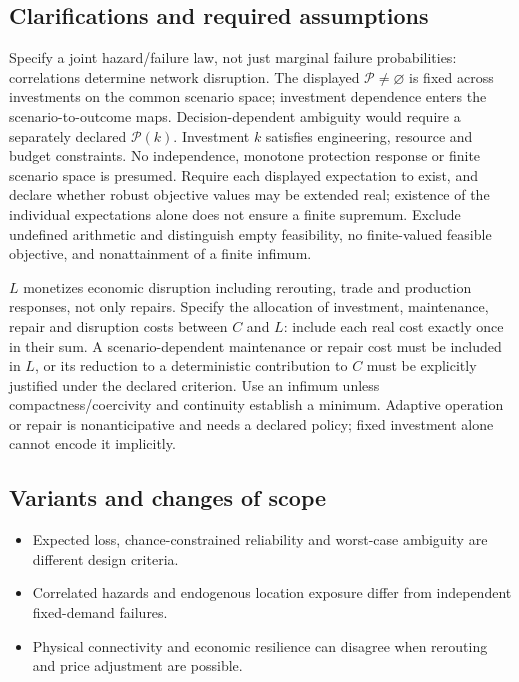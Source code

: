 \documentclass[11pt,a4paper]{article}
\begin{document}
\subsection*{Clarifications and required assumptions}

Specify a joint hazard/failure law, not just marginal failure probabilities: correlations determine network disruption. The displayed $\mathcal P\ne\varnothing$ is fixed across investments on the common scenario space; investment dependence enters the scenario-to-outcome maps. Decision-dependent ambiguity would require a separately declared $\mathcal P(k)$. Investment $k$ satisfies engineering, resource and budget constraints. No independence, monotone protection response or finite scenario space is presumed. Require each displayed expectation to exist, and declare whether robust objective values may be extended real; existence of the individual expectations alone does not ensure a finite supremum. Exclude undefined arithmetic and distinguish empty feasibility, no finite-valued feasible objective, and nonattainment of a finite infimum.

$L$ monetizes economic disruption including rerouting, trade and production responses, not only repairs. Specify the allocation of investment, maintenance, repair and disruption costs between $C$ and $L$: include each real cost exactly once in their sum. A scenario-dependent maintenance or repair cost must be included in $L$, or its reduction to a deterministic contribution to $C$ must be explicitly justified under the declared criterion. Use an infimum unless compactness/coercivity and continuity establish a minimum. Adaptive operation or repair is nonanticipative and needs a declared policy; fixed investment alone cannot encode it implicitly.

\subsection*{Variants and changes of scope}

\begin{itemize}
\item Expected loss, chance-constrained reliability and worst-case ambiguity are different design criteria.
\item Correlated hazards and endogenous location exposure differ from independent fixed-demand failures.
\item Physical connectivity and economic resilience can disagree when rerouting and price adjustment are possible.
\end{itemize}
\end{document}
